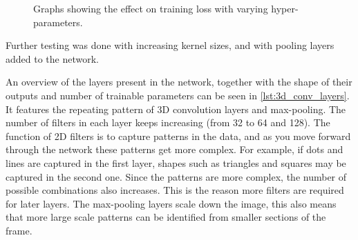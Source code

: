 \begin{figure}[htb]%
    \centering
    \caption{Graphs showing the effect on training loss with varying hyper-parameters.}%
    \label{fig:hyperparameter_tests}%
\end{figure}

Further testing was done with increasing kernel sizes, and with pooling layers added to the network. 

An overview of the layers present in the network, together with the shape of their outputs and number of trainable parameters can be seen in \cref{lst:3d_conv_layers}. It features the repeating pattern of 3D convolution layers and max-pooling. The number of filters in each layer keeps increasing (from 32 to 64 and 128). The function of 2D filters is to capture patterns in the data, and as you move forward through the network these patterns get more complex. For example, if dots and lines are captured in the first layer, shapes such as triangles and squares may be captured in the second one. Since the patterns are more complex, the number of possible combinations also increases. This is the reason more filters are required for later layers. The max-pooling layers scale down the image, this also means that more large scale patterns can be identified from smaller sections of the frame.

